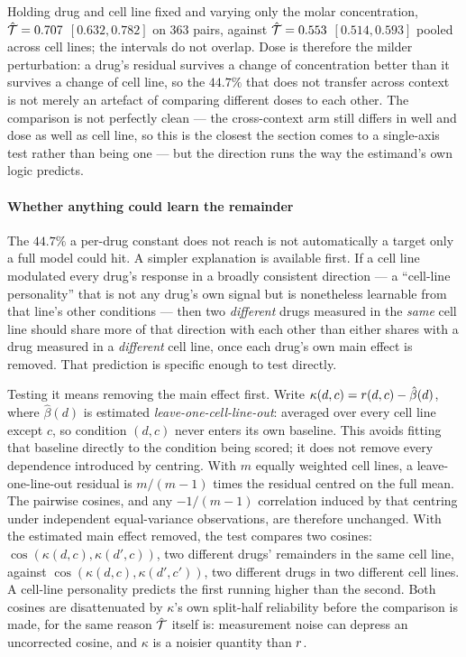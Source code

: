 Holding drug and cell line fixed and varying only the molar concentration,
$\hat{\mathcal{T}} = 0.707$ $[0.632, 0.782]$ on $\num{363}$ pairs, against
$\hat{\mathcal{T}} = 0.553$ $[0.514, 0.593]$ pooled across cell lines; the intervals
do not overlap. Dose is therefore the milder perturbation: a drug's residual
survives a change of concentration better than it survives a change of cell
line, so the $44.7\%$ that does not transfer across context is not merely an
artefact of comparing different doses to each other. The comparison is not
perfectly clean --- the cross-context arm still differs in well and dose as well
as cell line, so this is the closest the section comes to a single-axis test rather than being one --- but the direction runs the way the estimand's own logic
predicts.


 
\paragraph{Whether anything could learn the remainder} The $44.7\%$ a per-drug
constant does not reach is not automatically a target only a full model could
hit. A simpler explanation is available first. If a cell line modulated every
drug's response in a broadly consistent direction --- a ``cell-line
personality'' that is not any drug's own signal but is nonetheless learnable
from that line's other conditions --- then two \emph{different} drugs measured
in the \emph{same} cell line should share more of that direction with each
other than either shares with a drug measured in a \emph{different} cell line,
once each drug's own main effect is removed. That prediction is specific enough
to test directly.

Testing it means removing the main effect first. Write
$\kappa(d,c) = r(d,c) - \hat{\beta}(d)$, where $\hat\beta(d)$ is estimated
\emph{leave-one-cell-line-out}: averaged over every cell line except $c$, so
condition $(d,c)$ never enters its own baseline. This avoids fitting that
baseline directly to the condition being scored; it does not remove every
dependence introduced by centring. With $m$ equally weighted cell lines, a
leave-one-line-out residual is $m/(m-1)$ times the residual centred on the
full mean. The pairwise cosines, and any $-1/(m-1)$ correlation induced by that
centring under independent equal-variance observations, are therefore unchanged.
With the estimated main effect removed, the test compares two cosines:
$\cos(\kappa(d,c), \kappa(d',c))$, two different drugs' remainders in the same
cell line, against $\cos(\kappa(d,c), \kappa(d',c'))$, two different drugs in
two different cell lines. A cell-line personality predicts the first running
higher than the second. Both cosines are disattenuated by $\kappa$'s own
split-half reliability before the comparison is made, for the same reason
$\hat{\mathcal{T}}$ itself is: measurement noise can depress an uncorrected cosine,
and $\kappa$ is a noisier quantity than $r$.


